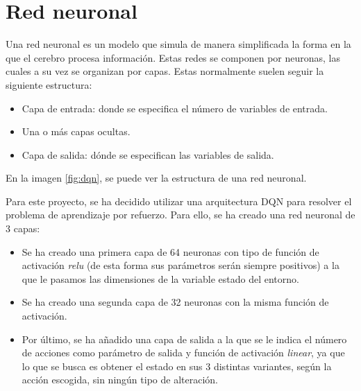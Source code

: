 \section{Red neuronal}

Una red neuronal\cite{RedNeuronal} es un modelo que simula de manera simplificada la forma en la que el cerebro procesa información.
Estas redes se componen por neuronas, las cuales a su vez se organizan por capas. Estas normalmente suelen seguir la siguiente estructura:
\begin{itemize}
    \item Capa de entrada: donde se especifica el número de variables de entrada.
    \item Una o más capas ocultas.
    \item Capa de salida: dónde se especifican las variables de salida.
\end{itemize}

En la imagen \ref{fig:dqn}, se puede ver la estructura de una red neuronal.

\label{fig:dqn}

Para este proyecto, se ha decidido utilizar una arquitectura DQN para resolver el problema de aprendizaje por refuerzo. Para ello, se ha creado una red neuronal de 3 capas:
\begin{itemize}
    \item Se ha creado una primera capa de 64 neuronas con tipo de función de activación \textit{relu}\cite{FuncActivacion} (de esta forma sus parámetros serán siempre positivos) a la que le pasamos las dimensiones de la variable estado del entorno.
    \item Se ha creado una segunda capa de 32 neuronas con la misma función de activación.
    \item Por último, se ha añadido una capa de salida a la que se le indica el número de acciones como parámetro de salida y función de activación \textit{linear}\cite{FuncActivacion}, ya que lo que se busca es obtener el estado en sus 3 distintas variantes, según la acción escogida, sin ningún tipo de alteración.
\end{itemize}
